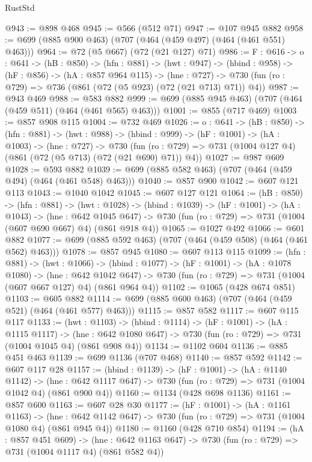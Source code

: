 \begin{lexlean}{RustStd}
\begin{coremodule}
{\begin{coremodule}
{@943 := @898 @468
@945 := @566 (@512 @71)
@947 := @107 @945 @882
@958 := @699 (@885 @900 @463) (@707 (@464 (@459 @497) (@464 (@461 @551) @463)))
@964 := @72 (@5 @667) (@72 (@21 @127) @71)
@986 := {F : @616} ->
  {o : @641} ->
  (hB : @850) ->
  (hfn : @881) ->
  (hwt : @947) ->
  (hbind : @958) ->
  (hF : @856) ->
  (hA : @857 @964 @115) ->
  (hne : @727) -> @730 (fun (ro : @729) => @736 (@861 (@72 (@5 @923) (@72 (@21 @713) @71)) @4))
@987 := @943 @469
@988 := @583 @882
@999 := @699 (@885 @945 @463) (@707 (@464 (@459 @511) (@464 (@461 @565) @463)))
@1001 := @855 (@717 @469)
@1003 := @857 @908 @115
@1004 := @732 @469
@1026 := {o : @641} ->
  (hB : @850) ->
  (hfn : @881) ->
  (hwt : @988) ->
  (hbind : @999) ->
  (hF : @1001) ->
  (hA : @1003) ->
  (hne : @727) ->
  @730 (fun (ro : @729) => @731 (@1004 @127 @4) (@861 (@72 (@5 @713) (@72 (@21 @690) @71)) @4))
@1027 := @987 @609
@1028 := @593 @882
@1039 := @699 (@885 @582 @463) (@707 (@464 (@459 @494) (@464 (@461 @548) @463)))
@1040 := @857 @900
@1042 := @607 @121 @113
@1043 := @1040 @1042
@1045 := @607 @127 @121
@1064 := (hB : @850) ->
  (hfn : @881) ->
  (hwt : @1028) ->
  (hbind : @1039) ->
  (hF : @1001) ->
  (hA : @1043) ->
  (hne : @642 @1045 @647) ->
  @730 (fun (ro : @729) => @731 (@1004 (@607 @690 @667) @4) (@861 @918 @4))
@1065 := @1027 @492
@1066 := @601 @882
@1077 := @699 (@885 @592 @463) (@707 (@464 (@459 @508) (@464 (@461 @562) @463)))
@1078 := @857 @945
@1080 := @607 @113 @115
@1099 := (hfn : @881) ->
  (hwt : @1066) ->
  (hbind : @1077) ->
  (hF : @1001) ->
  (hA : @1078 @1080) ->
  (hne : @642 @1042 @647) ->
  @730 (fun (ro : @729) => @731 (@1004 (@607 @667 @127) @4) (@861 @964 @4))
@1102 := @1065 (@428 @674 @851)
@1103 := @605 @882
@1114 := @699 (@885 @600 @463) (@707 (@464 (@459 @521) (@464 (@461 @577) @463)))
@1115 := @857 @582
@1117 := @607 @115 @117
@1133 := (hwt : @1103) ->
  (hbind : @1114) ->
  (hF : @1001) ->
  (hA : @1115 @1117) ->
  (hne : @642 @1080 @647) -> @730 (fun (ro : @729) => @731 (@1004 @1045 @4) (@861 @908 @4))
@1134 := @1102 @604
@1136 := @885 @451 @463
@1139 := @699 @1136 (@707 @468)
@1140 := @857 @592
@1142 := @607 @117 @28
@1157 := (hbind : @1139) ->
  (hF : @1001) ->
  (hA : @1140 @1142) ->
  (hne : @642 @1117 @647) -> @730 (fun (ro : @729) => @731 (@1004 @1042 @4) (@861 @900 @4))
@1160 := @1134 (@428 @698 @1136)
@1161 := @857 @600
@1163 := @607 @28 @30
@1177 := (hF : @1001) ->
  (hA : @1161 @1163) ->
  (hne : @642 @1142 @647) -> @730 (fun (ro : @729) => @731 (@1004 @1080 @4) (@861 @945 @4))
@1180 := @1160 (@428 @710 @854)
@1194 := (hA : @857 @451 @609) ->
  (hne : @642 @1163 @647) -> @730 (fun (ro : @729) => @731 (@1004 @1117 @4) (@861 @582 @4))
}
\end{coremodule}}
\end{coremodule}
\end{lexlean}
